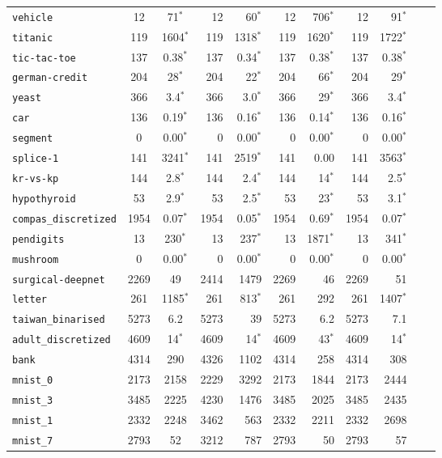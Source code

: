 \begin{tabular}{lccrrrrrrrr}
\texttt{vehicle} & 12 & 71$^*$ & 12 & 60$^*$ & 12 & 706$^*$ & 12 & 91$^*$\\
\texttt{titanic} & 119 & 1604$^*$ & 119 & 1318$^*$ & 119 & 1620$^*$ & 119 & 1722$^*$\\
\texttt{tic-tac-toe} & 137 & 0.38$^*$ & 137 & 0.34$^*$ & 137 & 0.38$^*$ & 137 & 0.38$^*$\\
\texttt{german-credit} & 204 & 28$^*$ & 204 & 22$^*$ & 204 & 66$^*$ & 204 & 29$^*$\\
\texttt{yeast} & 366 & 3.4$^*$ & 366 & 3.0$^*$ & 366 & 29$^*$ & 366 & 3.4$^*$\\
\texttt{car} & 136 & 0.19$^*$ & 136 & 0.16$^*$ & 136 & 0.14$^*$ & 136 & 0.16$^*$\\
\texttt{segment} & 0 & 0.00$^*$ & 0 & 0.00$^*$ & 0 & 0.00$^*$ & 0 & 0.00$^*$\\
\texttt{splice-1} & 141 & 3241$^*$ & 141 & 2519$^*$ & 141 & 0.00 & 141 & 3563$^*$\\
\texttt{kr-vs-kp} & 144 & 2.8$^*$ & 144 & 2.4$^*$ & 144 & 14$^*$ & 144 & 2.5$^*$\\
\texttt{hypothyroid} & 53 & 2.9$^*$ & 53 & 2.5$^*$ & 53 & 23$^*$ & 53 & 3.1$^*$\\
\texttt{compas\_discretized} & 1954 & 0.07$^*$ & 1954 & 0.05$^*$ & 1954 & 0.69$^*$ & 1954 & 0.07$^*$\\
\texttt{pendigits} & 13 & 230$^*$ & 13 & 237$^*$ & 13 & 1871$^*$ & 13 & 341$^*$\\
\texttt{mushroom} & 0 & 0.00$^*$ & 0 & 0.00$^*$ & 0 & 0.00$^*$ & 0 & 0.00$^*$\\
\texttt{surgical-deepnet} & 2269 & 49 & 2414 & 1479 & 2269 & 46 & 2269 & 51\\
\texttt{letter} & 261 & 1185$^*$ & 261 & 813$^*$ & 261 & 292 & 261 & 1407$^*$\\
\texttt{taiwan\_binarised} & 5273 & 6.2 & 5273 & 39 & 5273 & 6.2 & 5273 & 7.1\\
\texttt{adult\_discretized} & 4609 & 14$^*$ & 4609 & 14$^*$ & 4609 & 43$^*$ & 4609 & 14$^*$\\
\texttt{bank} & 4314 & 290 & 4326 & 1102 & 4314 & 258 & 4314 & 308\\
\texttt{mnist\_0} & 2173 & 2158 & 2229 & 3292 & 2173 & 1844 & 2173 & 2444\\
\texttt{mnist\_3} & 3485 & 2225 & 4230 & 1476 & 3485 & 2025 & 3485 & 2435\\
\texttt{mnist\_1} & 2332 & 2248 & 3462 & 563 & 2332 & 2211 & 2332 & 2698\\
\texttt{mnist\_7} & 2793 & 52 & 3212 & 787 & 2793 & 50 & 2793 & 57\\

\end{tabular}
